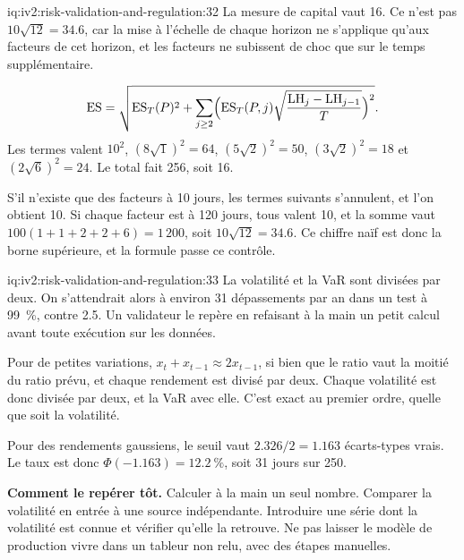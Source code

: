 \begin{solution}{iq:iv2:risk-validation-and-regulation:32}
La mesure de capital vaut 16. Ce n'est pas $10\sqrt{12} = 34.6$, car la mise à l'échelle de chaque horizon ne s'applique qu'aux facteurs de cet horizon, et les facteurs ne subissent de choc que sur le temps supplémentaire.

\[
\mathrm{ES} = \sqrt{\mathrm{ES}_T(P)^2 + \sum_{j \ge 2}\Bigl(\mathrm{ES}_T(P, j)\sqrt{\frac{\mathrm{LH}_j - \mathrm{LH}_{j-1}}{T}}\Bigr)^{2}}.
\]
Les termes valent $10^2$, $(8\sqrt{1})^2 = 64$, $(5\sqrt{2})^2 = 50$, $(3\sqrt{2})^2 = 18$ et $(2\sqrt{6})^2 = 24$. Le total fait 256, soit 16.

S'il n'existe que des facteurs à 10 jours, les termes suivants s'annulent, et l'on obtient 10. Si chaque facteur est à 120 jours, tous valent 10, et la somme vaut $100(1 + 1 + 2 + 2 + 6) = 1\,200$, soit $10\sqrt{12} = 34.6$. Ce chiffre naïf est donc la borne supérieure, et la formule passe ce contrôle.

\end{solution}

\begin{solution}{iq:iv2:risk-validation-and-regulation:33}
La volatilité et la VaR sont divisées par deux. On s'attendrait alors à environ 31 dépassements par an dans un test à 99~\%, contre 2.5. Un validateur le repère en refaisant à la main un petit calcul avant toute exécution sur les données.

Pour de petites variations, $x_t + x_{t-1} \approx 2x_{t-1}$, si bien que le ratio vaut la moitié du ratio prévu, et chaque rendement est divisé par deux. Chaque volatilité est donc divisée par deux, et la VaR avec elle. C'est exact au premier ordre, quelle que soit la volatilité.

Pour des rendements gaussiens, le seuil vaut $2.326/2 = 1.163$ écarts-types vrais. Le taux est donc $\Phi(-1.163) = 12.2~\%$, soit 31 jours sur 250.

\textbf{Comment le repérer tôt.} Calculer à la main un seul nombre. Comparer la volatilité en entrée à une source indépendante. Introduire une série dont la volatilité est connue et vérifier qu'elle la retrouve. Ne pas laisser le modèle de production vivre dans un tableur non relu, avec des étapes manuelles.

\end{solution}

